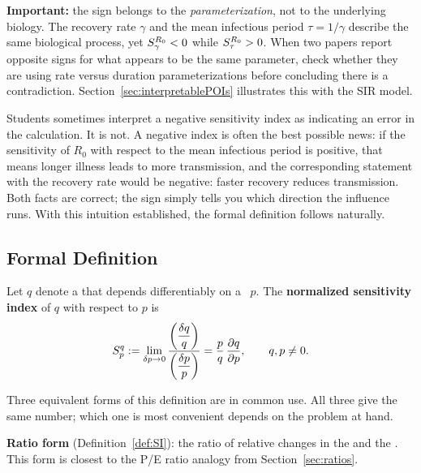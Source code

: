 \medskip\noindent
\textbf{Important:} the sign belongs to the \emph{parameterization},
not to the underlying biology. The recovery rate $\gamma$ and the
mean infectious period $\tau = 1/\gamma$ describe the same biological
process, yet $S_{\gamma}^{R_0} < 0$ while $S_{\tau}^{R_0} > 0$.
When two papers report opposite signs for what appears to be the same
parameter, check whether they are using rate versus duration
parameterizations before concluding there is a contradiction.
Section~\ref{sec:interpretablePOIs} illustrates this with the SIR model.

\medskip

Students sometimes interpret a negative sensitivity index as
indicating an error in the calculation. It is not.
A negative index is often the best possible news: if the sensitivity
of $R_0$ with respect to the mean infectious period is positive, that
means longer illness leads to more transmission, and the corresponding
statement with the recovery rate would be negative: faster recovery
reduces transmission. Both facts are correct; the sign simply tells
you which direction the influence runs.
With this intuition established, the formal definition follows naturally.

\subsection{Formal Definition}

\begin{definition}
\label{def:SI}
Let $q$ denote a \QOI that depends differentiably on a \POI~$p$.
The \textbf{normalized sensitivity index} of $q$ with respect to $p$ is
\begin{equation}
  S_{p}^{q} := \lim_{\delta p \to 0}
               \frac{\left(\dfrac{\delta q}{q}\right)}
                    {\left(\dfrac{\delta p}{p}\right)}
             = \frac{p}{q}\,\frac{\partial q}{\partial p},
  \qquad q, p \neq 0.
  \label{eq:SI}
\end{equation}
\end{definition}

Three equivalent forms of this definition are in common use.
All three give the same number; which one is most convenient
depends on the problem at hand.

\textbf{Ratio form} (Definition~\ref{def:SI}): the ratio of relative
changes in the \QOI and the \POI. This form is closest to the
P/E ratio analogy from Section~\ref{sec:ratios}.

